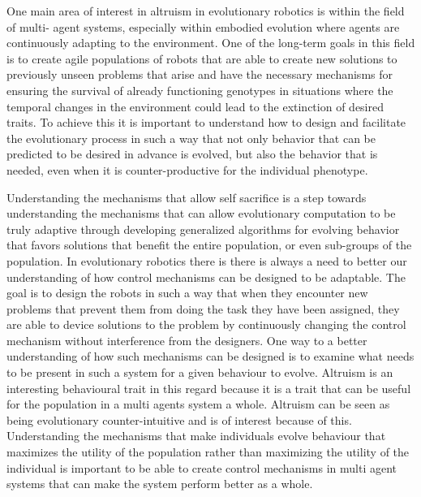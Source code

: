 \documentclass[a4paper]{book}
\begin{document}
One main area of interest in altruism in evolutionary robotics is within the field of multi- agent systems, especially within embodied evolution where agents are continuously adapting to the environment. One of the long-term goals in this field is to create agile populations of robots that are able to create new solutions to previously unseen problems that  arise and have the necessary mechanisms for ensuring the survival of already functioning genotypes in situations where the temporal changes in the environment could lead to the extinction of desired traits.  
To achieve this it is important to understand how to design and facilitate the evolutionary process in such a way that not only behavior that can be predicted to be desired in advance is evolved, but also the behavior that is needed, even when it is counter-productive for the individual phenotype.

Understanding the mechanisms that allow self sacrifice is a step towards understanding the mechanisms that can allow evolutionary computation to be truly adaptive through developing generalized algorithms for evolving behavior that favors solutions that benefit the entire population, or even sub-groups of the population.
In evolutionary robotics there is there is always a need to better our understanding of how control mechanisms can be designed to be adaptable. 
The goal is to design the robots in such a way that when they encounter new problems that prevent them from doing the task they have been assigned, they are able to device solutions to the problem by continuously changing the control mechanism without interference from the designers. 
One way to a better understanding of how such mechanisms can be designed is to examine what needs to be present in such a system for a given behaviour to evolve. 
Altruism is an interesting behavioural trait in this regard because it is a trait that can be useful for the population in a multi agents system a whole.
Altruism can be seen as being evolutionary counter-intuitive and is of interest because of this. 
Understanding the mechanisms that make individuals evolve  behaviour that  maximizes the utility of the population rather than maximizing the utility of the individual is important to be able to create control mechanisms in multi agent systems that can make the system perform better as a whole.
\end{document}

